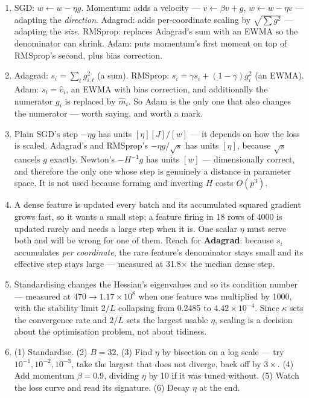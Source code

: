\documentclass[11pt,a4paper]{article}
\newcommand{\A}[1]{\item[\textbf{#1}]}
\begin{document}
\begin{enumerate}[leftmargin=1.9cm]
\A{U3.39} SGD: $w \leftarrow w - \eta g$. Momentum: adds a velocity ---
$v \leftarrow \beta v + g$, $w \leftarrow w - \eta v$ --- adapting the
\emph{direction}. Adagrad: adds per-coordinate scaling by
$\sqrt{\sum g^2}$ --- adapting the \emph{size}. RMSprop: replaces Adagrad's sum
with an EWMA so the denominator can shrink. Adam: puts momentum's first moment
on top of RMSprop's second, plus bias correction.

\A{U3.40} Adagrad: $s_i = \sum_t g_{i,t}^2$ (a sum). RMSprop:
$s_i = \gamma s_i + (1-\gamma)g_i^2$ (an EWMA). Adam: $s_i = \hat v_i$, an
EWMA with bias correction, and additionally the numerator $g_i$ is replaced by
$\hat m_i$. So Adam is the only one that also changes the numerator --- worth
saying, and worth a mark.

\A{U3.41} Plain SGD's step $-\eta g$ has units $[\eta][J]/[w]$ --- it depends
on how the loss is scaled. Adagrad's and RMSprop's $-\eta g/\sqrt s$ has units
$[\eta]$, because $\sqrt s$ cancels $g$ exactly. Newton's $-H^{-1}g$ has units
$[w]$ --- dimensionally correct, and therefore the only one whose step is
genuinely a distance in parameter space. It is not used because forming and
inverting $H$ costs $O(p^3)$.

\A{U3.42} A dense feature is updated every batch and its accumulated squared
gradient grows fast, so it wants a small step; a feature firing in 18 rows of
4000 is updated rarely and needs a large step when it is. One scalar $\eta$
must serve both and will be wrong for one of them. Reach for \textbf{Adagrad}:
because $s_i$ accumulates \emph{per coordinate}, the rare feature's denominator
stays small and its effective step stays large --- measured at 31.8$\times$ the
median dense step.

\A{U3.43} Standardising changes the Hessian's eigenvalues and so its condition
number --- measured at $470 \to 1.17\times10^8$ when one feature was multiplied
by 1000, with the stability limit $2/L$ collapsing from 0.2485 to
$4.42\times10^{-4}$. Since $\kappa$ sets the convergence rate and $2/L$ sets
the largest usable $\eta$, scaling is a decision about the optimisation
problem, not about tidiness.

\A{U3.44} (1) Standardise. (2) $B = 32$. (3) Find $\eta$ by bisection on a log
scale --- try $10^{-1}, 10^{-2}, 10^{-3}$, take the largest that does not
diverge, back off by $3\times$. (4) Add momentum $\beta = 0.9$, dividing $\eta$
by 10 if it was tuned without. (5) Watch the loss curve and read its signature.
(6) Decay $\eta$ at the end.
\end{enumerate}
\end{document}

